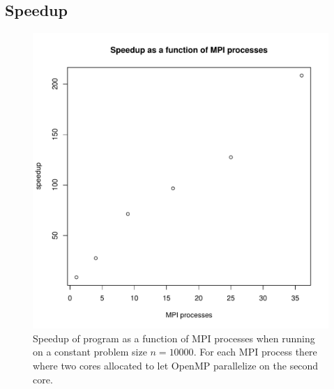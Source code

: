 \documentclass{article}
\begin{document}
\subsection{Speedup}
\begin{figure}[H]
  \begin{center}
    \includegraphics[width=12cm]{../analysis/mpi_nodes_speedup.pdf}
  \end{center}
  \caption{Speedup of program as a function of MPI processes when running on a constant problem size $n=10000$. For each MPI process there where two cores allocated to let OpenMP parallelize on the second core.}
  \label{mpi_nodes_speedup}
\end{figure}
\end{document}
